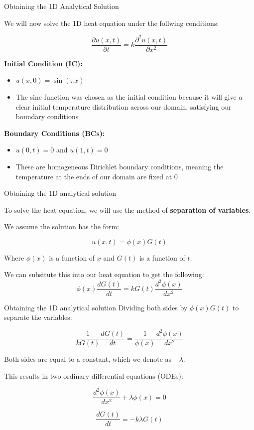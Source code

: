 \documentclass{beamer}
\begin{document}
\begin{frame}{Obtaining the 1D Analytical Solution}

We will now solve the 1D heat equation under the follwing conditions:

\[
\frac{\partial u(x,t)}{\partial t} = k \frac{\partial^2 u(x,t)}{\partial x^2}
\]

\textbf{Initial Condition (IC):} 
\begin{itemize}
    \item \( u(x, 0) = \sin(\pi x) \)
    \item The sine function was chosen as the initial condition because it will give a clear initial temperature distribution across our domain, satisfying our boundary conditions
\end{itemize}

\vspace{0.5cm}

\textbf{Boundary Conditions (BCs):} 
\begin{itemize}
    \item \( u(0,t) = 0 \) and \( u(1,t) = 0 \)
    \item These are homogeneous Dirichlet boundary conditions, meaning the temperature at the ends of our domain are fixed at 0
\end{itemize}
\end{frame}

\begin{frame}{Obtaining the 1D analytical solution}

To solve the heat equation, we will use the method of \textbf{separation of variables}.

We assume the solution has the form:

\[
u(x,t) = \phi(x) G(t)
\]

Where \(\phi(x)\) is a function of \(x\) and \(G(t)\) is a function of \(t\).

We can subsitute this into our heat equation to get the following:
\[
\phi(x) \frac{dG(t)}{dt} = k G(t) \frac{d^2 \phi(x)}{dx^2}
\]


\end{frame}

\begin{frame}{Obtaining the 1D analytical solution}
Dividing both sides by \(\phi(x) G(t)\) to separate the variables:

\[
\frac{1}{k G(t)} \frac{dG(t)}{dt} = \frac{1}{\phi(x)} \frac{d^2 \phi(x)}{dx^2}
\]

Both sides are equal to a constant, which we denote as \(-\lambda\).

This results in two ordinary differential equations (ODEs):

\[
\frac{d^2 \phi(x)}{dx^2} + \lambda \phi(x) = 0
\]

\[
\frac{dG(t)}{dt} = -k \lambda G(t)
\]

\end{frame}
\end{document}
